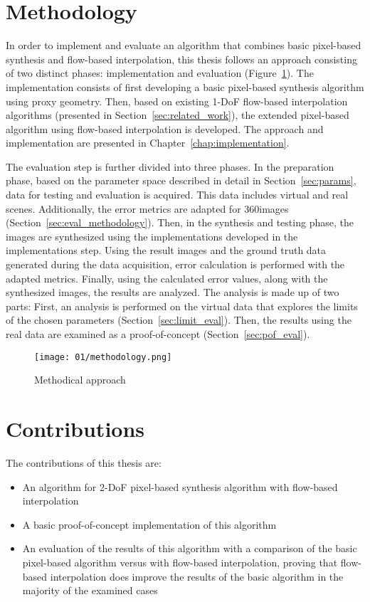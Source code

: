 \section*{Methodology}
In order to implement and evaluate an algorithm that combines basic pixel-based synthesis and flow-based interpolation, this thesis follows an approach consisting of two distinct phases: implementation and evaluation (Figure~\ref{fig:methodology}). The implementation consists of first developing a basic pixel-based synthesis algorithm using proxy geometry. Then, based on existing 1-DoF flow-based interpolation algorithms (presented in Section~\ref{sec:related_work}), the extended pixel-based algorithm using flow-based interpolation is developed. The approach and implementation are presented in Chapter~\ref{chap:implementation}.

The evaluation step is further divided into three phases. In the preparation phase, based on the parameter space described in detail in Section~\ref{sec:params}, data for testing and evaluation is acquired. This data includes virtual and real scenes. Additionally, the error metrics are adapted for 360\degree images (Section~\ref{sec:eval_methodology}).
Then, in the synthesis and testing phase, the images are synthesized using the implementations developed in the implementations step. Using the result images and the ground truth data generated during the data acquisition, error calculation is performed with the adapted metrics.
Finally, using the calculated error values, along with the synthesized images, the results are analyzed. The analysis is made up of two parts: First, an analysis is performed on the virtual data that explores the limits of the chosen parameters (Section~\ref{sec:limit_eval}). Then, the results using the real data are examined as a proof-of-concept (Section~\ref{sec:pof_eval}).

\begin{figure}
		\centering
		\texttt{[image: 01/methodology.png]}
		\caption{Methodical approach}
		\label{fig:methodology}
\end{figure}

\section*{Contributions}
The contributions of this thesis are:
\begin{itemize}
  \item An algorithm for 2-DoF pixel-based synthesis algorithm with flow-based interpolation
  \item A basic proof-of-concept implementation of this algorithm
  \item An evaluation of the results of this algorithm with a comparison of the basic pixel-based algorithm versus with flow-based interpolation, proving that flow-based interpolation does improve the results of the basic algorithm in the majority of the examined cases
\end{itemize}

